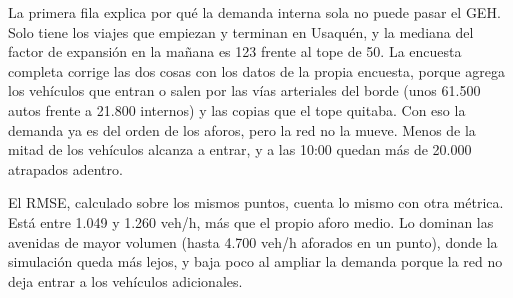 \begin{table}[ht]
\renewcommand{\arraystretch}{1.15}
\centering
\small
{}
\caption{GEH y RMSE de la simulación frente a los aforos HMD con distintas demandas. Entre paréntesis, el RMSE porcentual sobre el aforo medio (814 veh/h). $^{*}$La corrida con tráfico de paso no se conservó y el RMSE se agregó después.}
\label{tab:geh}
\end{table}

La primera fila explica por qué la demanda interna sola no puede pasar el GEH. Solo tiene los viajes que empiezan y terminan en Usaquén, y la mediana del factor de expansión en la mañana es 123 frente al tope de 50. La encuesta completa corrige las dos cosas con los datos de la propia encuesta, porque agrega los vehículos que entran o salen por las vías arteriales del borde (unos 61.500 autos frente a 21.800 internos) y las copias que el tope quitaba. Con eso la demanda ya es del orden de los aforos, pero la red no la mueve. Menos de la mitad de los vehículos alcanza a entrar, y a las 10:00 quedan más de 20.000 atrapados adentro.

El RMSE, calculado sobre los mismos puntos, cuenta lo mismo con otra métrica. Está entre 1.049 y 1.260 veh/h, más que el propio aforo medio. Lo dominan las avenidas de mayor volumen (hasta 4.700 veh/h aforados en un punto), donde la simulación queda más lejos, y baja poco al ampliar la demanda porque la red no deja entrar a los vehículos adicionales.

